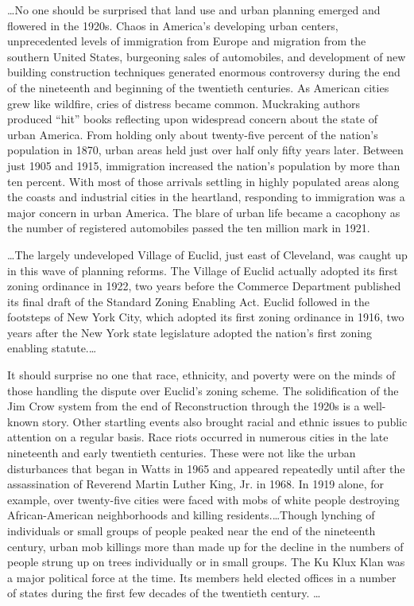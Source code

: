 

\ldots No one should be surprised that land use and urban planning emerged and
flowered in the 1920s. Chaos in America's developing urban centers,
unprecedented levels of immigration from Europe and migration from the southern
United States, burgeoning sales of automobiles, and development of new building
construction techniques generated enormous controversy during the end of the
nineteenth and beginning of the twentieth centuries. As American cities grew
like wildfire, cries of distress became common. Muckraking authors produced
``hit'' books reflecting upon widespread concern about the state of urban
America. From holding only about twenty-five percent of the nation's population
in 1870, urban areas held just over half only fifty years later. Between just
1905 and 1915, immigration increased the nation's population by more than ten
percent. With most of those arrivals settling in highly populated areas along
the coasts and industrial cities in the heartland, responding to immigration was
a major concern in urban America. The blare of urban life became a cacophony as
the number of registered automobiles passed the ten million mark in 1921.

\ldots The largely undeveloped Village of Euclid, just east of Cleveland, was
caught up in this wave of planning reforms. The Village of Euclid actually
adopted its first zoning ordinance in 1922, two years before the Commerce
Department published its final draft of the Standard Zoning Enabling Act. Euclid
followed in the footsteps of New York City, which adopted its first zoning
ordinance in 1916, two years after the New York state legislature adopted the
nation's first zoning enabling statute.\ldots

It should surprise no one that race, ethnicity, and poverty were on the minds of
those handling the dispute over Euclid's zoning scheme. The solidification of
the Jim Crow system from the end of Reconstruction through the 1920s is a
well-known story. Other startling events also brought racial and ethnic issues
to public attention on a regular basis. Race riots occurred in numerous cities
in the late nineteenth and early twentieth centuries. These were not like the
urban disturbances that began in Watts in 1965 and appeared repeatedly until
after the assassination of Reverend Martin Luther King, Jr. in 1968. In 1919
alone, for example, over twenty-five cities were faced with mobs of white people
destroying African-American neighborhoods and killing residents.\ldots Though
lynching of individuals or small groups of people peaked near the end of the
nineteenth century, urban mob killings more than made up for the decline in the
numbers of people strung up on trees individually or in small groups. The Ku
Klux Klan was a major political force at the time. Its members held elected
offices in a number of states during the first few decades of the twentieth
century. \ldots

